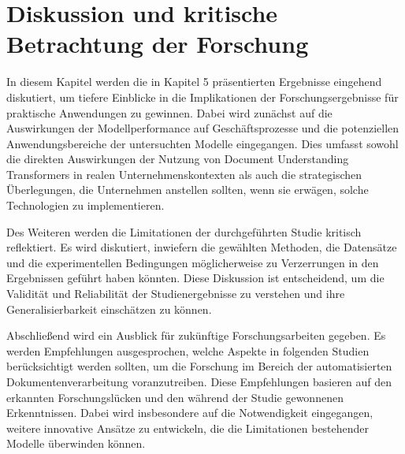 \chapter{Diskussion und kritische Betrachtung der Forschung}
In diesem Kapitel werden die in Kapitel 5 präsentierten Ergebnisse eingehend diskutiert, um tiefere Einblicke in die Implikationen der Forschungsergebnisse für praktische Anwendungen zu gewinnen. Dabei wird zunächst auf die Auswirkungen der Modellperformance auf Geschäftsprozesse und die potenziellen Anwendungsbereiche der untersuchten Modelle eingegangen. Dies umfasst sowohl die direkten Auswirkungen der Nutzung von Document Understanding Transformers in realen Unternehmenskontexten als auch die strategischen Überlegungen, die Unternehmen anstellen sollten, wenn sie erwägen, solche Technologien zu implementieren.

Des Weiteren werden die Limitationen der durchgeführten Studie kritisch reflektiert. Es wird diskutiert, inwiefern die gewählten Methoden, die Datensätze und die experimentellen Bedingungen möglicherweise zu Verzerrungen in den Ergebnissen geführt haben könnten. Diese Diskussion ist entscheidend, um die Validität und Reliabilität der Studienergebnisse zu verstehen und ihre Generalisierbarkeit einschätzen zu können.

Abschließend wird ein Ausblick für zukünftige Forschungsarbeiten gegeben. Es werden Empfehlungen ausgesprochen, welche Aspekte in folgenden Studien berücksichtigt werden sollten, um die Forschung im Bereich der automatisierten Dokumentenverarbeitung voranzutreiben. Diese Empfehlungen basieren auf den erkannten Forschungslücken und den während der Studie gewonnenen Erkenntnissen. Dabei wird insbesondere auf die Notwendigkeit eingegangen, weitere innovative Ansätze zu entwickeln, die die Limitationen bestehender Modelle überwinden können.

